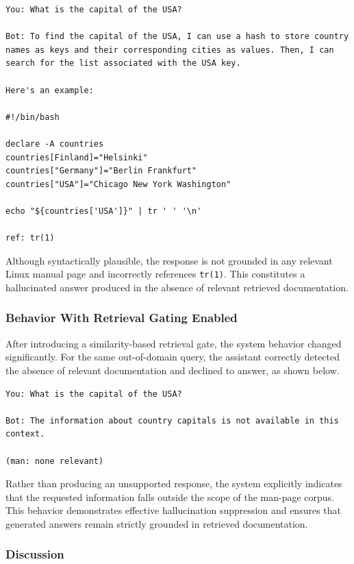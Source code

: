 \documentclass[conference]{IEEEtran}
\begin{document}
\begin{lstlisting}[caption={Example of hallucinated response without retrieval gating}, label={lst:hallucination}]
You: What is the capital of the USA?

Bot: To find the capital of the USA, I can use a hash to store country names as keys and their corresponding cities as values. Then, I can search for the list associated with the USA key.

Here's an example:

#!/bin/bash

declare -A countries
countries[Finland]="Helsinki"
countries["Germany"]="Berlin Frankfurt"
countries["USA"]="Chicago New York Washington"

echo "${countries['USA']}" | tr ' ' '\n'

ref: tr(1)
\end{lstlisting}

Although syntactically plausible, the response is not grounded in any relevant Linux manual page and incorrectly references \texttt{tr(1)}. This constitutes a hallucinated answer produced in the absence of relevant retrieved documentation.

\subsubsection{Behavior With Retrieval Gating Enabled}

After introducing a similarity-based retrieval gate, the system behavior changed significantly. For the same out-of-domain query, the assistant correctly detected the absence of relevant documentation and declined to answer, as shown below.

\begin{lstlisting}[caption={Correct refusal with retrieval gating enabled}, label={lst:gated}]
You: What is the capital of the USA?

Bot: The information about country capitals is not available in this context.

(man: none relevant)
\end{lstlisting}

Rather than producing an unsupported response, the system explicitly indicates that the requested information falls outside the scope of the man-page corpus. This behavior demonstrates effective hallucination suppression and ensures that generated answers remain strictly grounded in retrieved documentation.

\subsubsection{Discussion}
\end{document}
